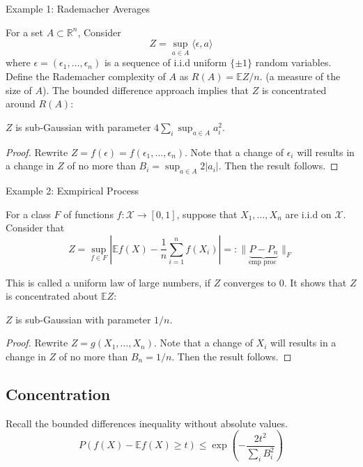 Example 1: Rademacher Averages \cite*{Bartlett:2020}

For a set $A \subset \mathbb{R}^n$, Consider
\begin{equation}
  Z=\sup _{a \in A}\langle\epsilon, a\rangle
\end{equation}
where $\epsilon = (\epsilon_1, \dots, \epsilon_n)$ is a sequence of i.i.d uniform $\{ \pm 1 \}$ random variables. 
Define the Rademacher complexity of $A$ as $R(A) = \mathbb{E}Z/n$. (a measure of the size of $A$). 
The bounded difference approach implies that $Z$ is concentrated around $R(A)$:
  \begin{corollary}
    $Z$ is sub-Gaussian with parameter $4\sum_i \sup_{a \in A} a_{i}^2$.
  \end{corollary}

  \begin{proof}
    Rewrite $Z = f(\epsilon) = f(\epsilon_1, \dots, \epsilon_n)$. 
    Note that a change of $\epsilon_i$ will results in a change in $Z$ of no more than $B_i = \sup_{a \in A} 2 \left| a_i \right|$.
    Then the result follows.
  \end{proof}

Example 2: Exmpirical Process \cite*{Bartlett:2020}

For a class $F$ of functions $f: \mathcal{X} \rightarrow [0,1]$, suppose that $X_1, \dots, X_n $ are i.i.d on $\mathcal{X}$.
Consider that 
\begin{equation}
  Z=\sup _{f \in F}\left|\mathbb{E} f(X)-\frac{1}{n} \sum_{i=1}^{n} f\left(X_{i}\right)\right|=:\|\underbrace{P-P_{n}}_{\text {emp proc }}\|_{F}
\end{equation}

This is called a uniform law of large numbers, if $Z$ converges to 0.
It shows that $Z$ is concentrated about $\mathbb{E}Z$:

\begin{corollary}
  $Z$ is sub-Gaussian with parameter $1/n$.
\end{corollary}

\begin{proof}
  Rewrite $Z = g(X_1, \dots, X_n)$. Note that a change of $X_i$ will results in a change in $Z$ of no more than $B_n = 1/n$.
  Then the result follows.
\end{proof}

\subsection{Concentration}
Recall the bounded differences inequality without absolute values. 
\begin{equation}
    P(f(X)-\mathbb{E} f(X) \geq t) \leq \exp \left(-\frac{2 t^{2}}{\sum_{i} B_{i}^{2}}\right)
\end{equation}

